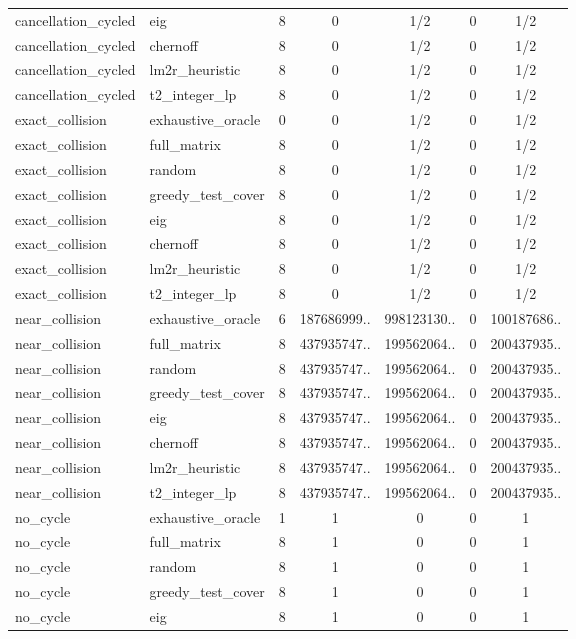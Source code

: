 \begin{table}[p]
\begin{tabular}{@{}llccccc@{}}
cancellation\_cycled & eig & 8 & 0 & 1/2 & 0 & 1/2 \\
cancellation\_cycled & chernoff & 8 & 0 & 1/2 & 0 & 1/2 \\
cancellation\_cycled & lm2r\_heuristic & 8 & 0 & 1/2 & 0 & 1/2 \\
cancellation\_cycled & t2\_integer\_lp & 8 & 0 & 1/2 & 0 & 1/2 \\
exact\_collision & exhaustive\_oracle & 0 & 0 & 1/2 & 0 & 1/2 \\
exact\_collision & full\_matrix & 8 & 0 & 1/2 & 0 & 1/2 \\
exact\_collision & random & 8 & 0 & 1/2 & 0 & 1/2 \\
exact\_collision & greedy\_test\_cover & 8 & 0 & 1/2 & 0 & 1/2 \\
exact\_collision & eig & 8 & 0 & 1/2 & 0 & 1/2 \\
exact\_collision & chernoff & 8 & 0 & 1/2 & 0 & 1/2 \\
exact\_collision & lm2r\_heuristic & 8 & 0 & 1/2 & 0 & 1/2 \\
exact\_collision & t2\_integer\_lp & 8 & 0 & 1/2 & 0 & 1/2 \\
near\_collision & exhaustive\_oracle & 6 & 187686999.. & 998123130.. & 0 & 100187686.. \\
near\_collision & full\_matrix & 8 & 437935747.. & 199562064.. & 0 & 200437935.. \\
near\_collision & random & 8 & 437935747.. & 199562064.. & 0 & 200437935.. \\
near\_collision & greedy\_test\_cover & 8 & 437935747.. & 199562064.. & 0 & 200437935.. \\
near\_collision & eig & 8 & 437935747.. & 199562064.. & 0 & 200437935.. \\
near\_collision & chernoff & 8 & 437935747.. & 199562064.. & 0 & 200437935.. \\
near\_collision & lm2r\_heuristic & 8 & 437935747.. & 199562064.. & 0 & 200437935.. \\
near\_collision & t2\_integer\_lp & 8 & 437935747.. & 199562064.. & 0 & 200437935.. \\
no\_cycle & exhaustive\_oracle & 1 & 1 & 0 & 0 & 1 \\
no\_cycle & full\_matrix & 8 & 1 & 0 & 0 & 1 \\
no\_cycle & random & 8 & 1 & 0 & 0 & 1 \\
no\_cycle & greedy\_test\_cover & 8 & 1 & 0 & 0 & 1 \\
no\_cycle & eig & 8 & 1 & 0 & 0 & 1 \\

\end{tabular}
\end{table}
